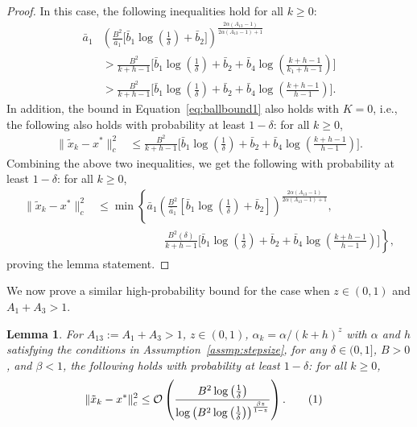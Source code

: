 \documentclass{article}
\newcommand{\numberthis}{\addtocounter{equation}{1}\tag{\theequation}}
\newcommand{\lrp}[1]{\left( #1 \right)}
\newtheorem{lemma}[theorem]{Lemma}
\begin{document}
\begin{proof}
 In this case, the following inequalities hold for all $k \ge 0$: 
\begin{align*}
    \bar{a}_1 &\lrp{\frac{B^2}{\bar{a}_1} \big[\bar{b}_1\log\left(\frac{1}{\delta}\right) + \bar{b}_2 \big] }^\frac{2\alpha (A_{13} - 1)}{2\alpha (A_{13}-1) + 1}
    \\
    &> \frac{B^2}{k+h-1} \bigg[\bar{b}_1\log\left(\frac{1}{\delta}\right) + \bar{b}_2  + \bar{b}_4 \log\left(\frac{k+h-1}{k_1+h-1}\right)\bigg]  \\
    &> \frac{B^2}{k+h-1} \bigg[\bar{b}_1\log\left(\frac{1}{\delta}\right) + \bar{b}_2  + \bar{b}_4 \log\left(\frac{k+h-1}{h-1}\right)\bigg]. 
\end{align*}
In addition, the bound  in Equation~\eqref{eq:ballbound1} also holds with $K = 0$, i.e., the following also holds with probability at least $1-\delta$: for all $ k \ge 0$,
\begin{align*}
 \|\tilde{x}_k - x^*\|^2_c 
&\leq \frac{B^2}{k+h-1} \bigg[\bar{b}_1\log\left(\frac{1}{\delta}\right) + \bar{b}_2 + \bar{b}_4 \log\left(\frac{k+h-1}{h-1}\right)\bigg].
\end{align*}
Combining the above two inequalities, we get the following with probability at least $1-\delta$: for all $k\ge 0$, 
\begin{align*}
 \|\tilde{x}_k - x^*\|^2_c 
&\leq \min\left\{ \bar{a}_1 \lrp{\frac{B^2}{\bar{a}_1} \left[\bar{b}_1\log\left(\frac{1}{\delta}\right) + \bar{b}_2 \right]}^\frac{2\alpha (A_{13}-1)}{2\alpha (A_{13}-1) + 1}, \right. \\
&\qquad\qquad\qquad \left. \frac{B^2(\delta)}{k+h-1} \bigg[\bar{b}_1\log\left(\frac{1}{\delta}\right) + \bar{b}_2 + \bar{b}_4 \log\left(\frac{k+h-1}{h-1}\right)\bigg] \right\},
\end{align*}
proving the lemma statement. 
\end{proof}

We now prove a similar high-probability bound for the case when $z \in (0,1)$ and $A_1 + A_3 > 1$. 



\begin{lemma}\label{lem:ballbound2}
    For $A_{13}:= A_1 + A_3 > 1$, $z\in (0,1)$, $\alpha_k = \alpha/(k+h)^z$ with $\alpha$ and $h$ satisfying the conditions in Assumption~\ref{assmp:stepsize}, for any $\delta \in (0,1]$, $B > 0$, and  $\beta < 1$, %
    the following holds with probability at least $1-\delta$: for all $k \ge 0$,
    \begin{align*}
 \|\tilde{x}_k - x^*\|^2_c 
&\leq \mathcal{O}\lrp{ \frac{B^2 \log\left(\frac{1}{\delta}\right)}{ \log\lrp{B^2\log\left(\frac{1}{\delta}\right)}^{\frac{\beta z}{1-z}} } }. \numberthis\label{eq:worstcaseintersectionvalue}  
\end{align*}
\end{lemma}
\end{document}
